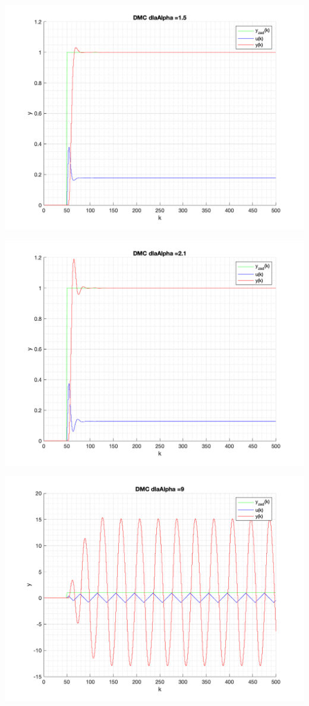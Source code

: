\documentclass[a4paper, 11pt]{article}
\begin{document}
\begin{enumerate}
 \includegraphics[width=\linewidth]{./ModelsDodatkowe_Alpha/P4_DMC_Alpha_1_5_png.png} 
 
 \includegraphics[width=\linewidth]{./ModelsDodatkowe_Alpha/P4_DMC_Alpha_2_1_png.png} 
 
 \includegraphics[width=\linewidth]{./ModelsDodatkowe_Alpha/P4_DMC_Alpha_9_png.png} 
 

\end{enumerate}
\end{document}
